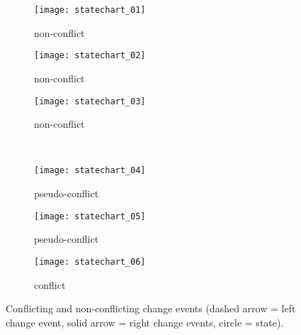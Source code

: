 \begin{figure}[ht]
    \begin{subfigure}[t]{0.30\linewidth}
        \texttt{[image: statechart\_01]}
        \caption{non-conflict}
        \label{fig:statechart_01}
    \end{subfigure}
    \hfill
    \begin{subfigure}[t]{0.30\linewidth}
        \texttt{[image: statechart\_02]}
        \caption{non-conflict}
        \label{fig:statechart_02}
    \end{subfigure}
    \hfill
    \begin{subfigure}[t]{0.30\linewidth}
        \texttt{[image: statechart\_03]}
        \caption{non-conflict}
        \label{fig:statechart_03}
    \end{subfigure}
    \\
    \begin{subfigure}[t]{0.30\linewidth}
        \texttt{[image: statechart\_04]}
        \caption{pseudo-conflict}
        \label{fig:statechart_04}
    \end{subfigure}
    \hfill
    \begin{subfigure}[t]{0.30\linewidth}
        \texttt{[image: statechart\_05]}
        \caption{pseudo-conflict}
        \label{fig:statechart_05}
    \end{subfigure}
    \hfill
    \begin{subfigure}[t]{0.30\linewidth}
        \texttt{[image: statechart\_06]}
        \caption{conflict}
        \label{fig:statechart_06}
    \end{subfigure}
    \caption{Conflicting and non-conflicting change events (dashed arrow = left change event, solid arrow = right change events, circle = state).}
    \label{fig:conflict_states}
\end{figure}

